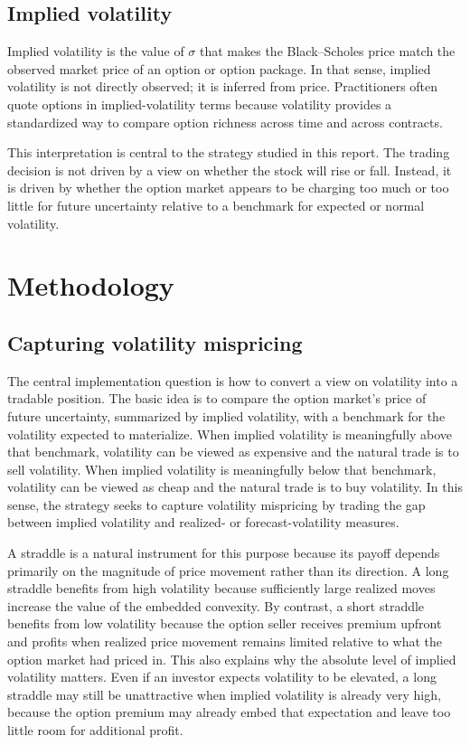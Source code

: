 ﻿\documentclass{article}
\begin{document}
\subsection{Implied volatility}

Implied volatility is the value of $\sigma$ that makes the Black--Scholes price match the observed market price of an option or option package. In that sense, implied volatility is not directly observed; it is inferred from price. Practitioners often quote options in implied-volatility terms because volatility provides a standardized way to compare option richness across time and across contracts.

This interpretation is central to the strategy studied in this report. The trading decision is not driven by a view on whether the stock will rise or fall. Instead, it is driven by whether the option market appears to be charging too much or too little for future uncertainty relative to a benchmark for expected or normal volatility.

\section{Methodology}
\label{sec:methodology}

\subsection{Capturing volatility mispricing}

The central implementation question is how to convert a view on volatility into a tradable position. The basic idea is to compare the option market's price of future uncertainty, summarized by implied volatility, with a benchmark for the volatility expected to materialize. When implied volatility is meaningfully above that benchmark, volatility can be viewed as expensive and the natural trade is to sell volatility. When implied volatility is meaningfully below that benchmark, volatility can be viewed as cheap and the natural trade is to buy volatility. In this sense, the strategy seeks to capture volatility mispricing by trading the gap between implied volatility and realized- or forecast-volatility measures.

A straddle is a natural instrument for this purpose because its payoff depends primarily on the magnitude of price movement rather than its direction. A long straddle benefits from high volatility because sufficiently large realized moves increase the value of the embedded convexity. By contrast, a short straddle benefits from low volatility because the option seller receives premium upfront and profits when realized price movement remains limited relative to what the option market had priced in. This also explains why the absolute level of implied volatility matters. Even if an investor expects volatility to be elevated, a long straddle may still be unattractive when implied volatility is already very high, because the option premium may already embed that expectation and leave too little room for additional profit.
\end{document}
